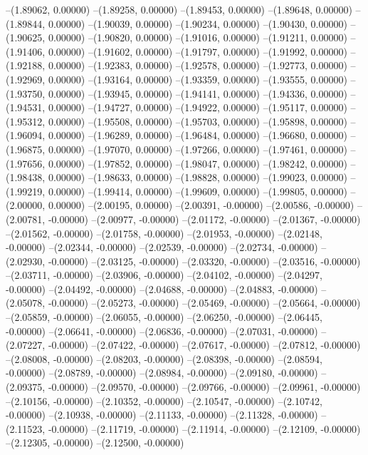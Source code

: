 --(1.89062, 0.00000)
--(1.89258, 0.00000)
--(1.89453, 0.00000)
--(1.89648, 0.00000)
--(1.89844, 0.00000)
--(1.90039, 0.00000)
--(1.90234, 0.00000)
--(1.90430, 0.00000)
--(1.90625, 0.00000)
--(1.90820, 0.00000)
--(1.91016, 0.00000)
--(1.91211, 0.00000)
--(1.91406, 0.00000)
--(1.91602, 0.00000)
--(1.91797, 0.00000)
--(1.91992, 0.00000)
--(1.92188, 0.00000)
--(1.92383, 0.00000)
--(1.92578, 0.00000)
--(1.92773, 0.00000)
--(1.92969, 0.00000)
--(1.93164, 0.00000)
--(1.93359, 0.00000)
--(1.93555, 0.00000)
--(1.93750, 0.00000)
--(1.93945, 0.00000)
--(1.94141, 0.00000)
--(1.94336, 0.00000)
--(1.94531, 0.00000)
--(1.94727, 0.00000)
--(1.94922, 0.00000)
--(1.95117, 0.00000)
--(1.95312, 0.00000)
--(1.95508, 0.00000)
--(1.95703, 0.00000)
--(1.95898, 0.00000)
--(1.96094, 0.00000)
--(1.96289, 0.00000)
--(1.96484, 0.00000)
--(1.96680, 0.00000)
--(1.96875, 0.00000)
--(1.97070, 0.00000)
--(1.97266, 0.00000)
--(1.97461, 0.00000)
--(1.97656, 0.00000)
--(1.97852, 0.00000)
--(1.98047, 0.00000)
--(1.98242, 0.00000)
--(1.98438, 0.00000)
--(1.98633, 0.00000)
--(1.98828, 0.00000)
--(1.99023, 0.00000)
--(1.99219, 0.00000)
--(1.99414, 0.00000)
--(1.99609, 0.00000)
--(1.99805, 0.00000)
--(2.00000, 0.00000)
--(2.00195, 0.00000)
--(2.00391, -0.00000)
--(2.00586, -0.00000)
--(2.00781, -0.00000)
--(2.00977, -0.00000)
--(2.01172, -0.00000)
--(2.01367, -0.00000)
--(2.01562, -0.00000)
--(2.01758, -0.00000)
--(2.01953, -0.00000)
--(2.02148, -0.00000)
--(2.02344, -0.00000)
--(2.02539, -0.00000)
--(2.02734, -0.00000)
--(2.02930, -0.00000)
--(2.03125, -0.00000)
--(2.03320, -0.00000)
--(2.03516, -0.00000)
--(2.03711, -0.00000)
--(2.03906, -0.00000)
--(2.04102, -0.00000)
--(2.04297, -0.00000)
--(2.04492, -0.00000)
--(2.04688, -0.00000)
--(2.04883, -0.00000)
--(2.05078, -0.00000)
--(2.05273, -0.00000)
--(2.05469, -0.00000)
--(2.05664, -0.00000)
--(2.05859, -0.00000)
--(2.06055, -0.00000)
--(2.06250, -0.00000)
--(2.06445, -0.00000)
--(2.06641, -0.00000)
--(2.06836, -0.00000)
--(2.07031, -0.00000)
--(2.07227, -0.00000)
--(2.07422, -0.00000)
--(2.07617, -0.00000)
--(2.07812, -0.00000)
--(2.08008, -0.00000)
--(2.08203, -0.00000)
--(2.08398, -0.00000)
--(2.08594, -0.00000)
--(2.08789, -0.00000)
--(2.08984, -0.00000)
--(2.09180, -0.00000)
--(2.09375, -0.00000)
--(2.09570, -0.00000)
--(2.09766, -0.00000)
--(2.09961, -0.00000)
--(2.10156, -0.00000)
--(2.10352, -0.00000)
--(2.10547, -0.00000)
--(2.10742, -0.00000)
--(2.10938, -0.00000)
--(2.11133, -0.00000)
--(2.11328, -0.00000)
--(2.11523, -0.00000)
--(2.11719, -0.00000)
--(2.11914, -0.00000)
--(2.12109, -0.00000)
--(2.12305, -0.00000)
--(2.12500, -0.00000)

